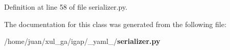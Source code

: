 \subsubsection{}\label{class__yaml___1_1serializer_1_1Serializer_9d5419a22fa192d1613c5f6190b8bb5b}




Definition at line 58 of file serializer.py.

The documentation for this class was generated from the following file:\begin{CompactItemize}
\item 
/home/juan/xul\_\-ga/igap/\_\-yaml\_\-/{\bf serializer.py}\end{CompactItemize}
